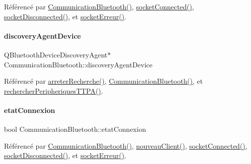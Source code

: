 Référencé par \hyperlink{class_communication_bluetooth_aa759c75b0df7f7e237eec495f156bba0}{Communication\+Bluetooth()}, \hyperlink{class_communication_bluetooth_ab4b02673b1d6ffd5970f9546360b25e7}{socket\+Connected()}, \hyperlink{class_communication_bluetooth_a87e96f5362c1334adb3c930566ca9b88}{socket\+Disconnected()}, et \hyperlink{class_communication_bluetooth_a41a4f8ab7deffd296d04018db20314a1}{socket\+Erreur()}.

\mbox{\label{class_communication_bluetooth_a9e04dbd88ba090525d6691cc1a4237b6}} 
\paragraph{\texorpdfstring{discovery\+Agent\+Device}{discoveryAgentDevice}}
{\footnotesize\ttfamily Q\+Bluetooth\+Device\+Discovery\+Agent$\ast$ Communication\+Bluetooth\+::discovery\+Agent\+Device\hspace{0.3cm}{\ttfamily [private]}}



Référencé par \hyperlink{class_communication_bluetooth_ab9993bd24a2f0c8254564a36cdf16069}{arreter\+Recherche()}, \hyperlink{class_communication_bluetooth_ae1c3be7b0a32ee1142d958bad3d7c571}{Communication\+Bluetooth()}, et \hyperlink{class_communication_bluetooth_a4c2e2d557728c227faeb247cb8a9c482}{rechercher\+Peripheriques\+T\+T\+P\+A()}.

\mbox{\label{class_communication_bluetooth_ae6ab740d6e6673fcc9a9f141bd295bc4}} 
\paragraph{\texorpdfstring{etat\+Connexion}{etatConnexion}}
{\footnotesize\ttfamily bool Communication\+Bluetooth\+::etat\+Connexion\hspace{0.3cm}{\ttfamily [private]}}



Référencé par \hyperlink{class_communication_bluetooth_aa759c75b0df7f7e237eec495f156bba0}{Communication\+Bluetooth()}, \hyperlink{class_communication_bluetooth_ab88c9bb8a1bd2c68e3d14fc3615be888}{nouveau\+Client()}, \hyperlink{class_communication_bluetooth_ab4b02673b1d6ffd5970f9546360b25e7}{socket\+Connected()}, \hyperlink{class_communication_bluetooth_a87e96f5362c1334adb3c930566ca9b88}{socket\+Disconnected()}, et \hyperlink{class_communication_bluetooth_a41a4f8ab7deffd296d04018db20314a1}{socket\+Erreur()}.

